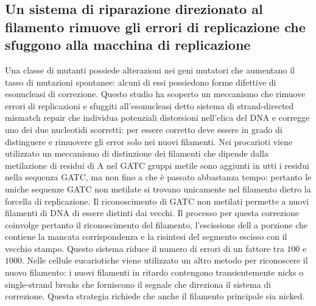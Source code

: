 \subsection{Un sistema di riparazione direzionato al filamento rimuove gli errori di replicazione che sfuggono alla macchina di replicazione}
Una classe di mutanti possiede alterazioni nei geni mutatori che aumentano il tasso di mutazioni spontanee: alcuni di essi possiedono forme difettive di esonucleasi di correzione. Questo
studio ha scoperto un meccanismo che rimuove errori di replicazioni e sfuggiti all'esonucleasi detto sistema di strand-directed mismatch repair che individua potenziali distorsioni 
nell'elica del DNA e corregge uno dei due nucleotidi scorretti: per essere corretto deve essere in grado di distinguere e rimuovere gli error solo nei nuovi filamenti. Nei procarioti
viene utilizzato un meccanismo di distinzione dei filamenti che dipende dalla metilazione di residui di A nel GATC gruppi metile sono aggiunti in utti i residui nella sequenza GATC, ma 
non fino a che \`e passato abbastanza tempo: pertanto le uniche sequenze GATC non metilate si trovano unicamente nel filamento dietro la forcella di replicazione. Il riconoscimento di 
GATC non metilati permette a nuovi filamenti di DNA di essere distinti dai vecchi. Il processo per questa correzione coinvolge pertanto il riconoscimento del filamento, l'escissione dell
a porzione che contiene la mancata corrispondenza e la risintesi del segmento escisso con il vecchio stampo. Questo sistema riduce il numero di errori di un fattore tra $100$ e $1000$. 
Nelle cellule eucariotiche viene utilizzato un altro metodo per riconoscere il nuovo filamento: i nuovi filamenti in ritardo contengono transientemente nicks o single-strand breaks che
forniscono il segnale che direziona il sistema di correzione. Questa strategia richiede che anche il filamento principale sia nicked. 
